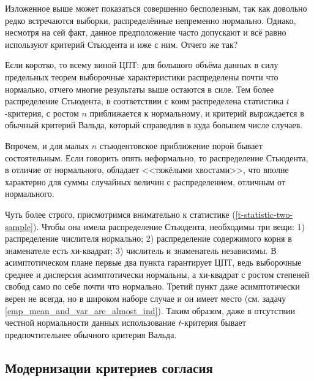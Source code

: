 Изложенное выше может показаться совершенно бесполезным, так как довольно редко встречаются выборки, распределённые непременно нормально. Однако, несмотря на сей факт, данное предположение часто допускают и всё равно используют критерий Стьюдента и иже с ним. Отчего же так?

	Если коротко, то всему виной ЦПТ: для большого объёма данных в силу предельных теорем выборочные характеристики распределены почти что нормально, отчего многие результаты выше остаются в силе. Тем более распределение Стьюдента, в соответствии с коим распределена статистика $t$-критерия, с ростом $n$ приближается к нормальному, и критерий вырождается в обычный критерий Вальда, который справедлив в куда большем числе случаев.
	
	Впрочем, и для малых $n$ стьюдентовское приближение порой бывает состоятельным. Если говорить опять неформально, то распределение Стьюдента, в отличие от нормального, обладает <<тяжёлыми хвостами>>, что вполне характерно для суммы случайных величин с распределением, отличным от нормального.
	
	Чуть более строго, присмотримся внимательно к статистике (\ref{t-statistic-two-sample}). Чтобы она имела распределение Стьюдента, необходимы три вещи: 1) распределение числителя нормально; 2) распределение содержимого корня в знаменателе есть хи-квадрат; 3) числитель и знаменатель независимы. В асимптотическом плане первые два пункта гарантирует ЦПТ, ведь выборочные среднее и дисперсия асимптотически нормальны, а хи-квадрат с ростом степеней свобод само по себе почти что нормально. Третий пункт даже асимптотически верен не всегда, но в широком наборе случае и он имеет место (см. задачу \ref{emp_mean_and_var_are_almost_ind}). Таким образом, даже в отсутствии честной нормальности данных использование $t$-критерия бывает предпочтительнее обычного критерия Вальда.
	




\subsection{Модернизации критериев согласия}

